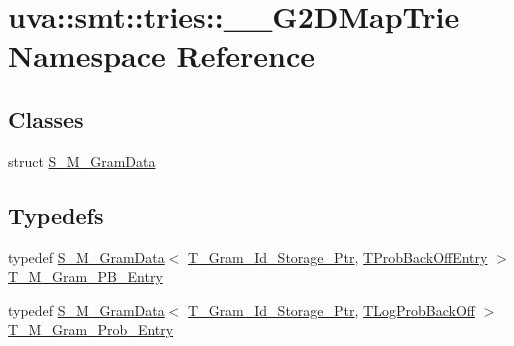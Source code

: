 \hypertarget{namespaceuva_1_1smt_1_1tries_1_1_____g2_d_map_trie}{}\section{uva\+:\+:smt\+:\+:tries\+:\+:\+\_\+\+\_\+\+G2\+D\+Map\+Trie Namespace Reference}
\label{namespaceuva_1_1smt_1_1tries_1_1_____g2_d_map_trie}
\subsection*{Classes}
\begin{DoxyCompactItemize}
\item 
struct \hyperlink{structuva_1_1smt_1_1tries_1_1_____g2_d_map_trie_1_1_s___m___gram_data}{S\+\_\+\+M\+\_\+\+Gram\+Data}
\end{DoxyCompactItemize}
\subsection*{Typedefs}
\begin{DoxyCompactItemize}
\item 
typedef \hyperlink{structuva_1_1smt_1_1tries_1_1_____g2_d_map_trie_1_1_s___m___gram_data}{S\+\_\+\+M\+\_\+\+Gram\+Data}$<$ \hyperlink{namespaceuva_1_1smt_1_1tries_1_1mgrams_1_1_m___gram___id_a478e6468dbd5dab37599c566d77c845c}{T\+\_\+\+Gram\+\_\+\+Id\+\_\+\+Storage\+\_\+\+Ptr}, \hyperlink{structuva_1_1smt_1_1tries_1_1_t_prob_back_off_entry}{T\+Prob\+Back\+Off\+Entry} $>$ \hyperlink{namespaceuva_1_1smt_1_1tries_1_1_____g2_d_map_trie_a6f09a333ff123d328ff8b0ed9eae8da3}{T\+\_\+\+M\+\_\+\+Gram\+\_\+\+P\+B\+\_\+\+Entry}
\item 
typedef \hyperlink{structuva_1_1smt_1_1tries_1_1_____g2_d_map_trie_1_1_s___m___gram_data}{S\+\_\+\+M\+\_\+\+Gram\+Data}$<$ \hyperlink{namespaceuva_1_1smt_1_1tries_1_1mgrams_1_1_m___gram___id_a478e6468dbd5dab37599c566d77c845c}{T\+\_\+\+Gram\+\_\+\+Id\+\_\+\+Storage\+\_\+\+Ptr}, \hyperlink{namespaceuva_1_1smt_1_1tries_acd0660255dd9ef5d644f01de49102750}{T\+Log\+Prob\+Back\+Off} $>$ \hyperlink{namespaceuva_1_1smt_1_1tries_1_1_____g2_d_map_trie_ad6e10b10a0496682f0609d968d7aab2a}{T\+\_\+\+M\+\_\+\+Gram\+\_\+\+Prob\+\_\+\+Entry}
\end{DoxyCompactItemize}
